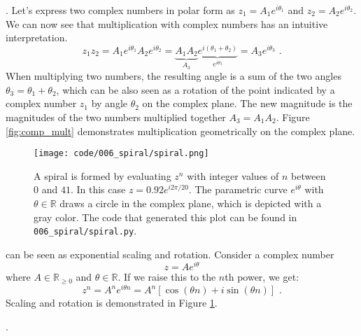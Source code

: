 . Let's express two complex numbers in polar form as $z_1=A_1e^{i\theta_1}$ and $z_2=A_2e^{i\theta_2}$. We can now see that multiplication with complex numbers has an intuitive interpretation.
\begin{equation}
  z_1 z_2 = A_1 e^{i\theta_1} A_2 e^{i\theta_2} = \underbrace{A_1
    A_2}_{A_3} \underbrace{e^{i(\theta_1 + \theta_2)}}_{e^{i\theta_3}} =
  A_3 e^{i\theta_3} \,\,.
\end{equation}
When multiplying two numbers, the resulting angle is a sum of the two angles $\theta_3=\theta_1 + \theta_2$, which can be also seen as a rotation of the point indicated by a complex number $z_1$ by angle $\theta_2$ on the complex plane. The new magnitude is the magnitudes of the two numbers multiplied together $A_3=A_1A_2$. Figure \ref{fig:comp_mult} demonstrates multiplication geometrically on the complex plane.

\begin{figure}
  \begin{center}
    \texttt{[image: code/006\_spiral/spiral.png]}
  \end{center}
  \caption{A spiral is formed by evaluating $z^n$ with integer values of $n$ between $0$ and $41$. In this case $z = 0.92 e^{i 2\pi /20}$. The parametric curve $e^{i\theta}$ with $\theta \in \mathbb{R}$ draws a circle in the complex plane, which is depicted with a gray color. The code that generated this plot can be found in \texttt{006\_spiral/spiral.py}.}
  \label{fig:spirals}
\end{figure}

 can be seen as exponential scaling and rotation. Consider a complex number
\begin{equation}
  z = A e^{i\theta}
\end{equation}
where $A \in \mathbb{R}_{\ge 0}$ and $\theta \in \mathbb{R}$. If we raise this to the $n$th power, we get:
\begin{equation}
  z^n = A^n e^{i\theta n} = A^n [\cos(\theta n) + i \sin(\theta n)]\,\,.
\end{equation}
Scaling and rotation is demonstrated in Figure \ref{fig:spirals}.

.






